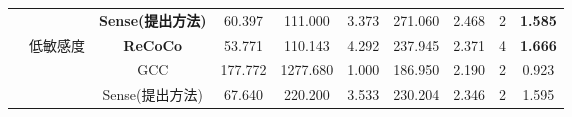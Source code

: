 \begin{table}[ht]
{\begin{tabular}{@{}cccccccccc@{}}
                                                                                                      &                            & \textbf{Sense(提出方法)} & 60.397          & 111.000             & 3.373             & 271.060                & 2.468    & 2            & \textbf{1.585} \\ \cmidrule(l){2-10} 
                                                                                                      & \multirow{3}{*}{低敏感度}       & \textbf{ReCoCo}      & 53.771          & 110.143             & 4.292             & 237.945                & 2.371    & 4            & \textbf{1.666}          \\
                                                                                                      &                            & GCC                  & 177.772         & 1277.680            & 1.000             & 186.950                & 2.190    & 2            & 0.923          \\
                                                                                                      &                            & Sense(提出方法)          & 67.640          & 220.200             & 3.533             & 230.204                & 2.346    & 2            & 1.595          \\ \bottomrule
\end{tabular}
}
    \label{tab:exp_results}
\end{table}